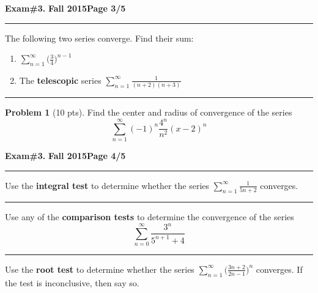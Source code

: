 \documentclass[12pt]{article}
\theoremstyle{definition}
\newtheorem{problem}{Problem}
\begin{document}
{%
\hfill{\large\bf Exam\#3.}\hfill{\large\bf
  Fall 2015}\hfill{\large\bf Page 3/5}\hrule

\bigskip
{\problem[10 pts]  The following two series converge. Find their sum:}
\begin{enumerate}
\item $\displaystyle{\sum_{n=1}^\infty \Big( \frac{3}{4} \Big)^{n-1}}$
\vspace{0.5cm}
\begin{flushright}
\end{flushright}
\item The \textbf{telescopic} series $\displaystyle{\sum_{n=1}^\infty \frac{1}{(n+2)(n+3)}}$
\vspace{5cm}
\begin{flushright}
\end{flushright}
\end{enumerate}
\hrule
\begin{problem}[10 pts]
Find the center and radius of convergence of the series
\begin{equation*}
\sum_{n=1}^\infty (-1)^n \frac{4^n}{n^2} (x-2)^n
\end{equation*}
\end{problem}
\newpage

\hfill{\large\bf Exam\#3.}\hfill{\large\bf
  Fall 2015}\hfill{\large\bf Page 4/5}\hrule

\bigskip
{\problem[10 pts]  Use the \textbf{integral test} to determine
  whether the series $\displaystyle{\sum_{n=1}^\infty \frac{1}{5n+2}}$
  converges.} 
\vspace{6.5cm}
\hrule
{\problem[10 pts]  Use any of the \textbf{comparison tests} to determine the
  convergence of the series}
\begin{equation*}
\sum_{n=0}^\infty \frac{3^n}{5^{n+1}+4}
\end{equation*}
\vspace{5cm}
\hrule
{\problem[10 pts]  Use the \textbf{root test} to determine whether
  the series $\displaystyle{\sum_{n=1}^\infty \Big( \frac{3n+2}{2n-1}
    \Big)^n}$ converges.  If the test is inconclusive, then say so.} 
\newpage

}
\end{document}
